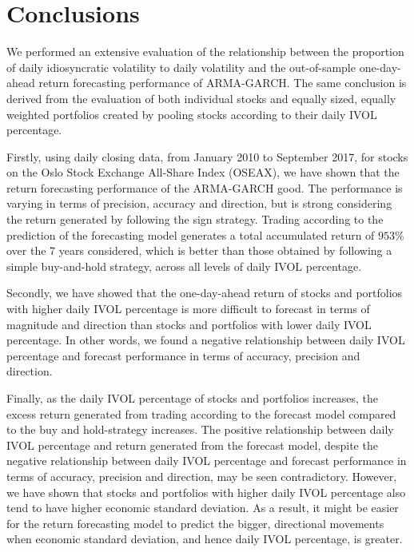 
\chapter{Conclusions}
\label{Conclusions}

We performed an extensive evaluation of the relationship between the proportion of daily idiosyncratic volatility to daily volatility and the out-of-sample one-day-ahead return forecasting performance of ARMA-GARCH. The same conclusion is derived from the evaluation of both individual stocks and equally sized, equally weighted portfolios created by pooling stocks according to their daily IVOL percentage. 

Firstly, using daily closing data, from January 2010 to September 2017, for stocks on the Oslo Stock Exchange All-Share Index (OSEAX), we have shown that the return forecasting performance of the ARMA-GARCH good. The performance is varying in terms of precision, accuracy and direction, but is strong considering the return generated by following the sign strategy. Trading according to the prediction of the forecasting model generates a total accumulated return of $953\%$ over the 7 years considered, which is better than those obtained by following a simple buy-and-hold strategy, across all levels of daily IVOL percentage.

Secondly, we have showed that the one-day-ahead return of stocks and portfolios with higher daily IVOL percentage is more difficult to forecast in terms of magnitude and direction than stocks and portfolios with lower daily IVOL percentage. In other words, we found a negative relationship between daily IVOL percentage and forecast performance in terms of accuracy, precision and direction.

Finally, as the  daily IVOL percentage of stocks and portfolios increases, the excess return generated from trading according to the forecast model compared to the buy and hold-strategy increases. The positive relationship between daily IVOL percentage and return generated from the forecast model, despite the negative relationship between daily IVOL percentage and forecast performance in terms of accuracy, precision and direction, may be seen contradictory. However, we have shown that stocks and portfolios with higher daily IVOL percentage also tend to have higher economic standard deviation. As a result, it might be easier for the return forecasting model to predict the bigger, directional movements when economic standard deviation, and hence daily IVOL percentage, is greater. 